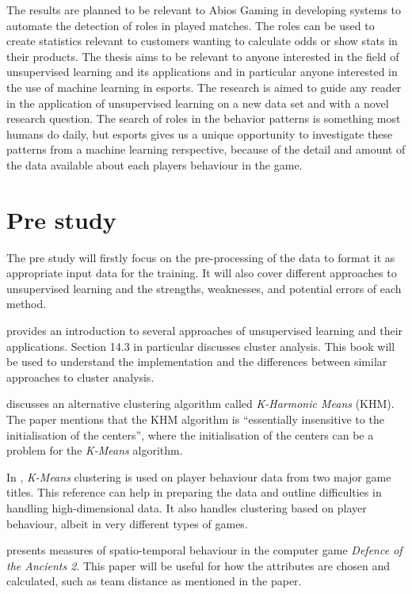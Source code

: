 \documentclass{article}
\begin{document}
The results are planned to be relevant to Abios Gaming in developing systems to automate the detection of roles in played matches. The roles can be used to create statistics relevant to customers wanting to calculate odds or show stats in their products.
The thesis aims to be relevant to anyone interested in the field of unsupervised learning and its applications and in particular anyone interested in the use of machine learning in esports. The research is aimed to guide any reader in the application of unsupervised learning on a new data set and with a novel research question. The search of roles in the behavior patterns is something most humans do daily, but esports gives us a unique opportunity to investigate these patterns from a machine learning rerspective, because of the detail and amount of the data available about each players behaviour in the game.

\section{Pre study}
The pre study will firstly focus on the pre-processing of the data to format it as appropriate input data for the training. It will also cover different approaches to unsupervised learning and the strengths, weaknesses, and potential errors of each method.

\cite{hastie2009unsupervised} provides an introduction to several approaches of unsupervised learning and their applications. Section 14.3 in particular discusses cluster analysis. This book will be used to understand the implementation and the differences between similar approaches to cluster analysis.

\cite{zhang1999k} discusses an alternative clustering algorithm called {\it K-Harmonic Means} (KHM). The paper mentions that the KHM algorithm is ``essentially insensitive to the initialisation of the centers'', where the initialisation of the centers can be a problem for the {\it K-Means} algorithm.

In \cite{DrachenA.2012Gsad}, {\it K-Means} clustering is used on player behaviour data from two major game titles. This reference can help in preparing the data and outline difficulties in handling high-dimensional data. It also handles clustering based on player behaviour, albeit in very different types of games.

\cite{DrachenA.2015Sdis} presents measures of spatio-temporal behaviour in the computer game {\it Defence of the Ancients 2}. This paper will be useful for how the attributes are chosen and calculated, such as team distance as mentioned in the paper.
\end{document}
